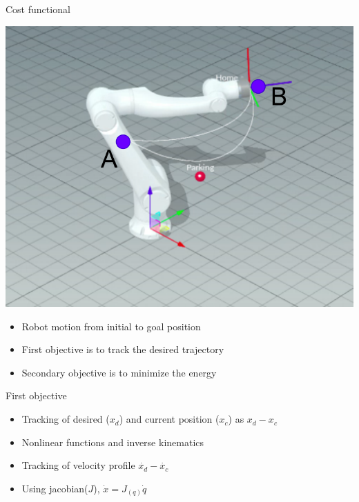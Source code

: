 \begin{frame}{Cost functional}
	
	\vspace{1cm}
	\begin{minipage}[c][\textheight][t]{0.5\textwidth}
		\centering 
		\includegraphics[width=1\linewidth]{lara.pdf}
	\end{minipage}\hfill
	\begin{minipage}[c][\textheight][t]{0.5\textwidth}
		\begin{itemize}
			\item
			Robot motion from initial to goal position
			\pause
			\item 
			First objective is to track the desired trajectory
			\pause 
			\item 
			Secondary objective is to minimize the energy 
		\end{itemize}
	\end{minipage}
	
\end{frame}



\begin{frame}{First objective}
	
	\begin{itemize}
		\item
		Tracking of desired ($x_d$) and current position ($x_c$) as $x_d-x_c$
		\pause
		\item
		Nonlinear functions and inverse kinematics
		\pause 
		\item
		Tracking of velocity profile $\dot{x_d}-\dot{x_c}$
		\pause
		\item
		Using jacobian($J$), $\dot{x} = J_{(q)} \dot{q}$ 
		
	\end{itemize}
\end{frame}



